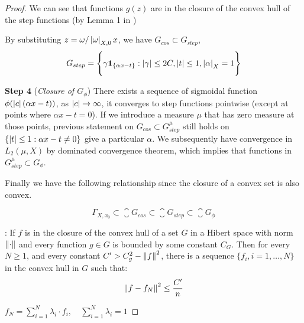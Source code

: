\begin{proof}
We can see that functions $g(z)$ are in the closure of the convex hull of the step functions (by Lemma 1 in \cite{barronUniversalApproximationBounds1993})

By substituting $z = \omega/\left| \omega \right|_{X, 0} x$, we have $G_{cos} \subset G_{step}$,
\begin{equation}
    G_{step} = \Bigg\{ \gamma\mathbf{1}_{\{\alpha x-t\}}: \left| \gamma \right| \leq 2C, \left| t \right| \leq 1, \left| \alpha \right|_{X} = 1\Bigg\}
\end{equation}

\textbf{Step 4} (\textit{Closure of $G_{\phi}$}) 
There exists a sequence of sigmoidal function $\phi(\left| c \right|(\alpha x - t))$, as $\left| c \right| \to \infty$,
it converges to step functions pointwise (except at points where $\alpha x - t = 0$).
If we introduce a measure $\mu$ that has zero measure at those points, 
previous statement on $G_{cos} \subset G^{\mu}_{step}$ still holds on 
$\{\left| t \right| \leq 1: \alpha x - t \not=0\}$ give a particular $\alpha$.
We subsequently have convergence in $L_2(\mu, X)$ by dominated convergence theorem, 
which implies that functions in $G^{\mu}_{step} \subset G_{\phi}$.

Finally we have the following relationship since the closure of a convex set is also convex.

\begin{equation*}
    \Gamma_{X, x_0} \subset \closure{G_{cos}} \subset \closure{G_{step}} \subset \closure{G_{\phi}}
\end{equation*}

\cite[\textit{Lemma~1}]{barronUniversalApproximationBounds1993}: If $f$ is in the closure of the convex hull of a set $G$ in a Hibert space
with norm $\left\| \cdot \right\|$ and every function $g \in G$ is bounded by some constant $C_G$. Then for every $N \geq 1$,
and every constant $C' > C_g^2 - \left\| f \right\|^2$, there is a sequence $\{f_i, i = 1, \dots, N\}$ in 
the convex hull in $G$ such that:
\begin{equation}
    \left\| f - f_N \right\|^2 \leq \frac{C'}{n}
\end{equation}

$f_N = \sum_{i=1}^N \lambda_i \cdot f_i, \quad \sum_{i=1}^N \lambda_i = 1$



\end{proof}
